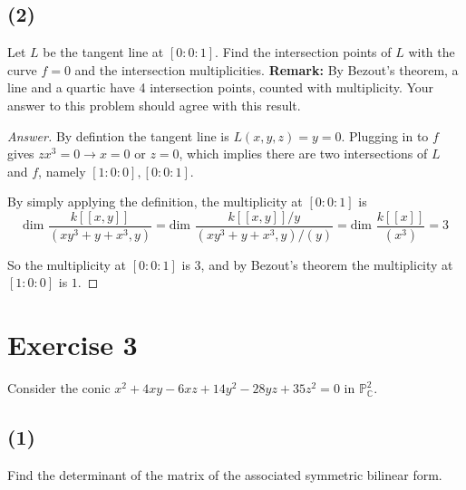 \documentclass{article}
\theoremstyle{definition}
\theoremstyle{definition}
\theoremstyle{remark}
\begin{document}
\subsection*{(2)}

Let \(L\) be the tangent line at \([0 : 0 : 1]\). Find the intersection points of \(L\) with the curve \(f = 0\) and the intersection multiplicities. \textbf{Remark:} By Bezout's theorem, a line and a quartic have 4 intersection points, counted with multiplicity. Your answer to this problem should agree with this result.


 \begin{proof}[Answer]
	By defintion the tangent line is $L(x, y, z) = y = 0$. 
	Plugging in to $f$ gives $zx^3 = 0 \rightarrow x =0 \text{ or } z = 0$, which implies there are two intersections of $L$ and $f$, namely $[1:0:0],[0:0:1]$.

	By simply applying the definition, the multiplicity at $[0:0:1]$ is  
	$$ \text{dim } \frac{k[[x,y]]}{(xy^3+y+x^3, y)}
	= \text{dim } \frac{k[[x,y]]/y}{(xy^3+y+x^3, y)/(y)}
	= \text{dim } \frac{k[[x]]}{(x^3)} = 3
	$$

	So the multiplicity at $[0:0:1]$ is $3$, and by Bezout's theorem the multiplicity at $[1:0:0]$ is $1$.
\end{proof}
	
\section*{Exercise 3}
Consider the conic \(x^2 + 4xy - 6xz + 14y^2 - 28yz + 35z^2 = 0\) in \(\mathbb{P}^2_\mathbb{C}\).

\subsection*{(1)}
Find the determinant of the matrix of the associated symmetric bilinear form.
\end{document}
